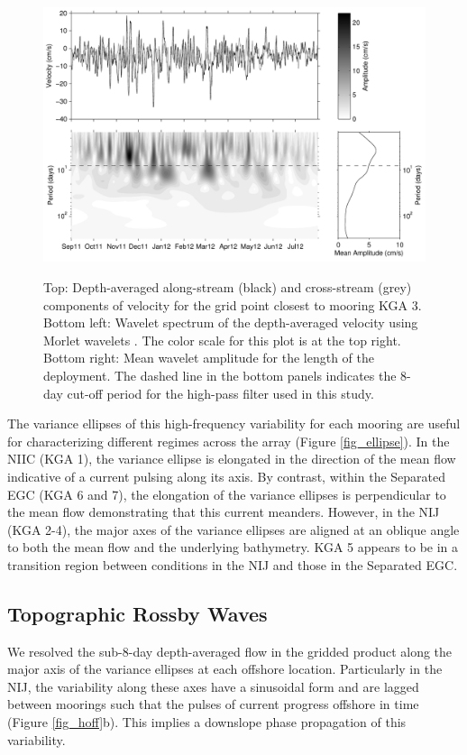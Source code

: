 \documentclass[12pt,titlepage,figuresatend]{article}
\begin{document}
\begin{figure}[ht!]
  \centering\includegraphics[width=\hsize]{./figures/TRWwavelet.pdf}
  \caption{Top: Depth-averaged along-stream (black) and cross-stream (grey) components of velocity for the grid point closest to mooring KGA 3. Bottom left: Wavelet spectrum of the depth-averaged velocity using Morlet wavelets \cite[]{Lilly2017}. The color scale for this plot is at the top right. Bottom right: Mean wavelet amplitude for the length of the deployment. The dashed line in the bottom panels indicates the 8-day cut-off period for the high-pass filter used in this study.}{\label{fig_waveSpec}}
\end{figure}

The variance ellipses of this high-frequency variability for each mooring are useful for characterizing different regimes across the array (Figure \ref{fig_ellipse}). In the NIIC (KGA 1), the variance ellipse is elongated in the direction of the mean flow indicative of a current pulsing along its axis. By contrast, within the Separated EGC (KGA 6 and 7), the elongation of the variance ellipses is perpendicular to the mean flow demonstrating that this current meanders. However, in the NIJ (KGA 2-4), the major axes of the variance ellipses are aligned at an oblique angle to both the mean flow and the underlying bathymetry. KGA 5 appears to be in a transition region between conditions in the NIJ and those in the Separated EGC.


\subsection{Topographic Rossby Waves}
\label{TRWsec}

We resolved the sub-8-day depth-averaged flow in the gridded product along the major axis of the variance ellipses at each offshore location. Particularly in the NIJ, the variability along these axes have a sinusoidal form and are lagged between moorings such that the pulses of current progress offshore in time (Figure \ref{fig_hoff}b). This implies a downslope phase propagation of this variability.
\end{document}
